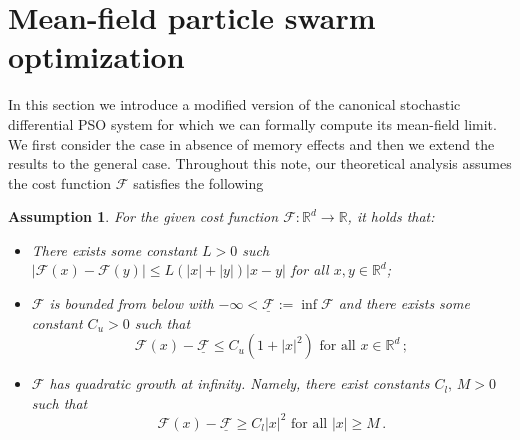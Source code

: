 \documentclass{ims9x6}
\newtheorem{assum}{Assumption}
\newcommand{\TE}{\mathcal{F}}
\newcommand{\RR}{\mathbb{R}}
\begin{document}
\section{Mean-field particle swarm optimization}
In this section we introduce a modified version of the canonical stochastic differential PSO system for which we can formally compute its mean-field limit. We first consider the case in absence of memory effects and then we extend the results to the general case.
Throughout this note, our theoretical analysis assumes the cost function $\TE$ satisfies the following
\begin{assum}\label{asum}
	For the given cost function $\TE:\RR^d\rightarrow \RR$, it holds that:
	\begin{itemize}
		\item[(1)]  There exists some constant $L>0$ such $|\TE(x)-\TE(y)|\leq L(|x|+|y|)|x-y|$ for all $x,y\in\RR^d$;
		\item[(2)]	$\TE$ is  bounded from below with $-\infty<\underline{\TE}:=\inf \TE$ and there exists some constant $C_u>0$ such that
		\begin{equation*}
		\TE(x)-\underline{\TE}\leq C_u(1+|x|^2)\mbox{ for all }x\in\RR^d\,;
		\end{equation*}
		\item[(3)]  $\TE$ has quadratic growth at infinity. Namely, there  exist constants $C_l,\, M>0$ such that
		\begin{equation*}
		\TE(x)-\underline{\TE}\geq C_l|x|^2\mbox{ for all }|x|\geq M\,.
		\end{equation*}
	\end{itemize}
\end{assum}
\end{document}
